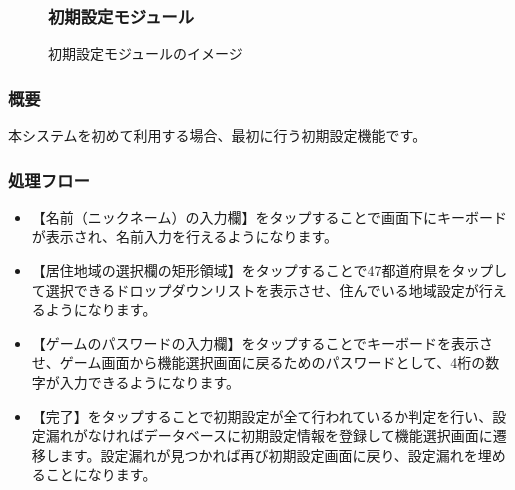 \documentclass[a4j]{jarticle}
\begin{document}
\begin{figure}[H]
\subsubsection{初期設定モジュール\label{初期設定}}
    \begin{center}
    \caption {初期設定モジュールのイメージ}
    \label{initialsetting}
    \end{center}
\end{figure}


\subsubsection*{概要}
本システムを初めて利用する場合、最初に行う初期設定機能です。


\subsubsection*{処理フロー}
\begin{itemize}
\item 【名前（ニックネーム）の入力欄】をタップすることで画面下にキーボードが表示され、名前入力を行えるようになります。

\item 【居住地域の選択欄の矩形領域】をタップすることで47都道府県をタップして選択できるドロップダウンリストを表示させ、住んでいる地域設定が行えるようになります。

\item 【ゲームのパスワードの入力欄】をタップすることでキーボードを表示させ、ゲーム画面から機能選択画面に戻るためのパスワードとして、4桁の数字が入力できるようになります。

\item 【完了】をタップすることで初期設定が全て行われているか判定を行い、設定漏れがなければデータベースに初期設定情報を登録して機能選択画面に遷移します。設定漏れが見つかれば再び初期設定画面に戻り、設定漏れを埋めることになります。
\end{itemize}
\end{document}
